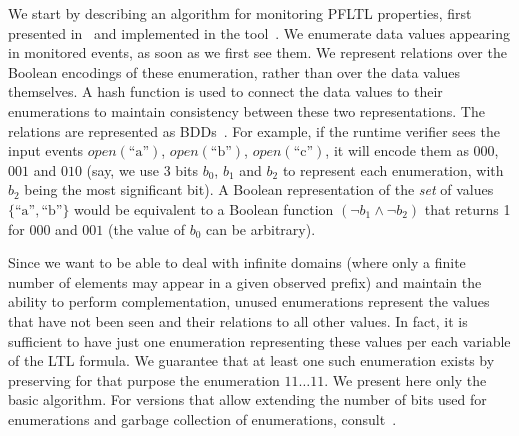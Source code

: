 We start by describing an algorithm for monitoring 
PFLTL properties, first presented in~\cite{HPU} and implemented
in the tool~\dejavu. 
We enumerate data values appearing in
monitored events, as soon as we first see them. We
represent relations over the Boolean
encodings of these enumeration, rather than over the data values themselves. A hash function is used to connect the data values to their enumerations to maintain consistency
between these two representations.
The relations are
represented as BDDs~\cite{Bryant}. 
For example, if the runtime verifier sees the input 
events 
$\mathit{open}(\text{``a''})$, 
$\mathit{open}(\text{``b''})$, 
$\mathit{open}(\text{``c''})$, 
it will encode them as
$000$, $001$ and $010$ (say, we use 3 bits $b_0$, $b_1$ and $b_2$
to represent each enumeration, with $b_2$ being the most significant bit).
%
A Boolean representation of the {\em set} of values 
$\{\text{``a''},\text{``b''}\} $ would be equivalent to a Boolean function $(\neg b_1 \wedge \neg b_2)$ that returns 1 for $000$ and $001$ (the value
of $b_0$ can be arbitrary).

%

Since we want to be able to deal with infinite domains
(where only a finite number of elements may appear in a given observed prefix) and maintain the ability to perform
complementation, unused enumerations represent the
values that have not been seen and their relations
to all other values. 
In fact, it is sufficient to have just one enumeration representing these values per each variable of the LTL formula. 
We guarantee that at least one such enumeration exists by preserving for that purpose the enumeration $11\ldots11$.
We present here only the basic algorithm. For versions that
allow extending the number of bits used for enumerations and garbage collection of enumerations, consult~\cite{HP}.

